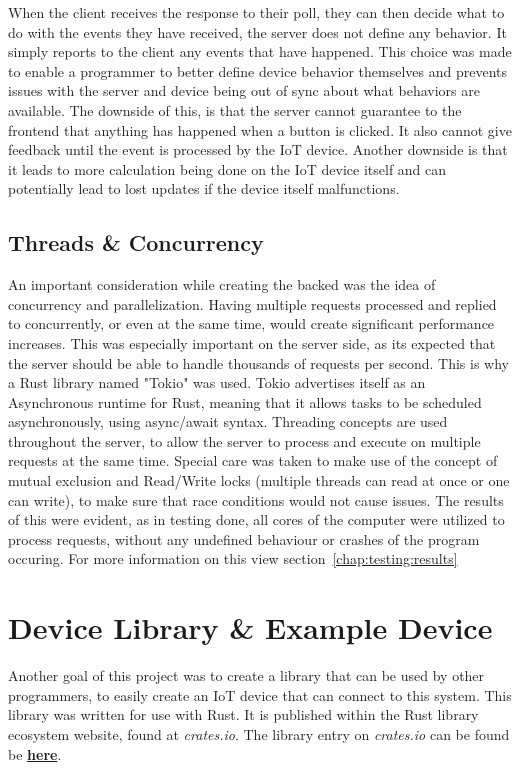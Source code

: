 When the client receives the response to their poll, they can then decide what to do with the events they have received, the server does not define any behavior. It simply reports to the client any events that have happened. This choice was made to enable a programmer to better define device behavior themselves and prevents issues with the server and device being out of sync about what behaviors are available. The downside of this, is that the server cannot guarantee to the frontend that anything has happened when a button is clicked. It also cannot give feedback until the event is processed by the IoT device. Another downside is that it leads to more calculation being done on the IoT device itself and can potentially lead to lost updates if the device itself malfunctions.


\subsection{Threads \& Concurrency} \label{sec:chapimpl:server:threads}
An important consideration while creating the backed was the idea of concurrency and parallelization. Having multiple requests processed and replied to concurrently, or even at the same time, would create significant performance increases. This was especially important on the server side, as its expected that the server should be able to handle thousands of requests per second. This is why a Rust library named "Tokio" was used. Tokio advertises itself as an Asynchronous runtime for Rust, meaning that it allows tasks to be scheduled asynchronously, using async/await syntax. Threading concepts are used throughout the server, to allow the server to process and execute on multiple requests at the same time. Special care was taken to make use of the concept of mutual exclusion and Read/Write locks (multiple threads can read at once or one can write), to make sure that race conditions would not cause issues. The results of this were evident, as in testing done, all cores of the computer were utilized to process requests, without any undefined behaviour or crashes of the program occuring. For more information on this view section~\ref{chap:testing:results}

\section{Device Library \& Example Device} \label{sec:chapimpl:devicelib}
Another goal of this project was to create a library that can be used by other programmers, to easily create an IoT device that can connect to this system. This library was written for use with Rust. It is published within the Rust library ecosystem website, found at \textit{crates.io}. The library entry on \textit{crates.io} can be found be \textbf{\href{https://crates.io/crates/NOSHP-Client}{here}}. 

